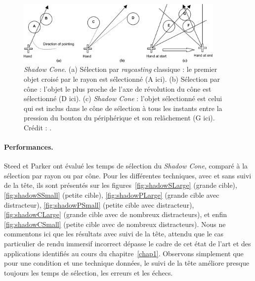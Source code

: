 	\begin{figure}[!htbp]
		\centering
		\includegraphics[width=0.9\textwidth]{figures/ch2/shadow}
		\caption[Fonctionnement du \emph{Shadow Cone}]{\emph{Shadow Cone}. (a) Sélection par \emph{raycasting} classique : le premier objet croisé par le rayon est sélectionné (A ici). (b) Sélection par cône : l'objet le plus proche de l'axe de révolution du cône est sélectionné (D ici). (c) \emph{Shadow Cone} : l'objet sélectionné est celui qui est inclus dans le cône de sélection à tous les instants entre la pression du bouton du périphérique et son relâchement (G ici). Crédit : \cite{steed20043d}.}
		\label{fig:shadow}
	\end{figure}
	
	\paragraph{Performances.}
	Steed et Parker ont évalué les temps de sélection du \emph{Shadow Cone}, comparé à la sélection par rayon ou par cône. Pour les différentes techniques, avec et sans suivi de la tête, ils sont présentés sur les figures~\ref{fig:shadowSLarge} (grande cible), \ref{fig:shadowSSmall} (petite cible), \ref{fig:shadowPLarge} (grande cible avec distracteur), \ref{fig:shadowPSmall} (petite cible avec distracteur), \ref{fig:shadowCLarge} (grande cible avec de nombreux distracteurs), et enfin \ref{fig:shadowCSmall} (petite cible avec de nombreux distracteurs). Nous ne commentons ici que les résultats avec suivi de la tête, attendu que le cas particulier de rendu immersif incorrect dépasse le cadre de cet état de l'art et des applications identifiés au cours du chapitre~\ref{chap1}. Observons simplement que pour une condition et une technique données, le suivi de la tête améliore presque toujours les temps de sélection, les erreurs et les échecs.

